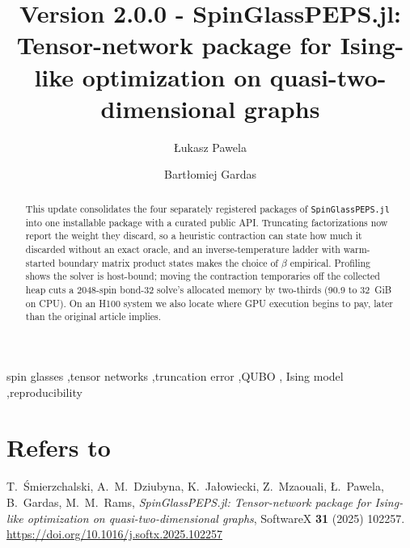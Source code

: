 \documentclass[preprint,12pt,a4paper]{elsarticle}
\begin{document}
\begin{frontmatter}

\title{Version 2.0.0 - SpinGlassPEPS.jl: Tensor-network package for
Ising-like optimization on quasi-two-dimensional graphs}

\author[iitis]{\L{}ukasz Pawela}
\author[iitis]{Bart\l{}omiej Gardas}


\address[iitis]{Institute of Theoretical and Applied Informatics, Polish Academy
of Sciences, Ba\l{}tycka 5, 44-100 Gliwice, Poland}

\begin{abstract}
This update consolidates the four separately registered packages of
\texttt{SpinGlassPEPS.jl} into one installable package with a curated public API.
Truncating factorizations now report the weight they discard, so a heuristic
contraction can state how much it discarded without an exact oracle, and an
inverse-temperature ladder with warm-started boundary matrix product states makes
the choice of $\beta$ empirical. Profiling shows the solver is host-bound; moving
the contraction temporaries off the collected heap cuts a 2048-spin bond-32
solve's allocated memory by two-thirds (90.9 to 32~GiB on CPU). On an H100 system
we also locate where GPU execution begins to pay, later than the original article
implies.
\end{abstract}

\begin{keyword}
spin glasses \sep tensor networks \sep truncation error \sep QUBO \sep
Ising model \sep reproducibility
\end{keyword}

\end{frontmatter}

\section*{Refers to}

T.~\'Smierzchalski, A.~M.~Dziubyna, K.~Ja\l{}owiecki, Z.~Mzaouali, \L{}.~Pawela,
B.~Gardas, M.~M.~Rams, \emph{SpinGlassPEPS.jl: Tensor-network package for
Ising-like optimization on quasi-two-dimensional graphs}, SoftwareX \textbf{31}
(2025) 102257. \url{https://doi.org/10.1016/j.softx.2025.102257}
\end{document}
